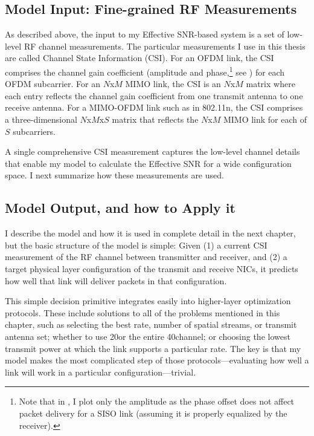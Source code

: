 \subsection{Model Input: Fine-grained RF Measurements}
\label{sec:csi}
As described above, the input to my Effective SNR-based system is a set of low-level RF channel measurements. The particular measurements I use in this thesis are called Channel State Information (CSI). For an OFDM link, the CSI comprises the channel gain coefficient (amplitude and phase,\footnote{Note that in , I plot only the amplitude as the phase offset does not affect packet delivery for a SISO link (assuming it is properly equalized by the receiver).} see ) for each OFDM subcarrier. For an $N$x$M$ MIMO link, the CSI is an $N$x$M$ matrix where each entry reflects the channel gain coefficient from one transmit antenna to one receive antenna. For a MIMO-OFDM link such as in 802.11n, the CSI comprises a three-dimensional $N$x$M$x$S$ matrix that reflects the $N$x$M$ MIMO link for each of $S$ subcarriers.

A single comprehensive CSI measurement captures the low-level channel details that enable my model to calculate the Effective SNR for a wide configuration space. I next summarize how these measurements are used.

\subsection{Model Output, and how to Apply it}
I describe the model and how it is used in complete detail in the next chapter, but the basic structure of the model is simple: Given (1) a current CSI measurement of the RF channel between transmitter and receiver, and (2) a target physical layer configuration of the transmit and receive NICs, it predicts how well that link will deliver packets in that configuration.

This simple decision primitive integrates easily into higher-layer optimization protocols. These include solutions to all of the problems mentioned in this chapter, such as selecting the best rate, number of spatial streams, or transmit antenna set; whether to use 20\MHz or the entire 40\MHz channel; or choosing the lowest transmit power at which the link supports a particular rate. The key is that my model makes the most complicated step of those protocols---evaluating how well a link will work in a particular configuration---trivial.



